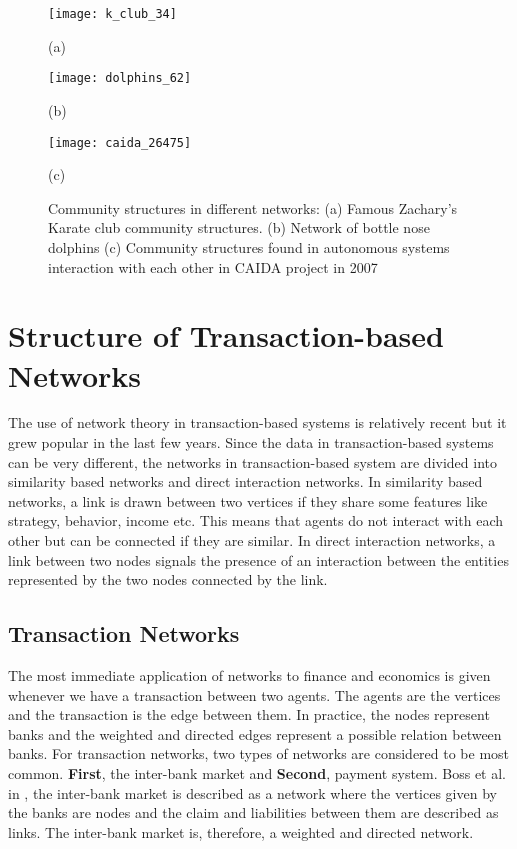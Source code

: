 \begin{figure}[H]
	\centering
	\begin{minipage}[b]{0.4\textwidth}
		\texttt{[image: k\_club\_34]}
		\caption*{(a)}
	\end{minipage}
	\begin{minipage}[b]{0.4\textwidth}
		\texttt{[image: dolphins\_62]}
		\caption*{(b)}
	\end{minipage}
	\begin{minipage}[b]{0.8\textwidth}
		\texttt{[image: caida\_26475]}
		\caption*{(c)}
	\end{minipage}
	\caption{Community structures in different networks: (a) Famous Zachary's Karate club community structures. (b) Network of bottle nose dolphins (c) Community structures found in autonomous systems interaction with each other in CAIDA project in 2007}
	\label{fig:communities_extra}
\end{figure}

\section{Structure of Transaction-based Networks}
The use of network theory in transaction-based systems is relatively recent but it grew popular in the last few years. Since the data in transaction-based systems can be very different, the networks in transaction-based system are divided into similarity based networks and direct interaction networks. In similarity based networks, a link is drawn between two vertices if they share some features like strategy, behavior, income etc. This means that agents do not interact with each other but can be connected if they are similar. In direct interaction networks, a link between two nodes signals the presence of an interaction between the entities represented by the two nodes connected by the link. 

\subsection{Transaction Networks}
The most immediate application of networks to finance and economics is given whenever we have a transaction between two agents. The agents are the vertices and the transaction is the edge between them. In practice, the nodes represent banks and the weighted and directed edges represent a possible relation between banks. For transaction networks, two types of networks are considered to be most common. \textbf{First}, the inter-bank market and \textbf{Second}, payment system. Boss et al. in \cite{ref-20}, the inter-bank market is described as a network where the vertices given by the banks are nodes and the claim and liabilities between them are described as links. The inter-bank market is, therefore, a weighted and directed network.

